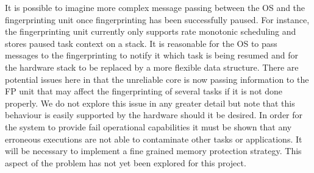 	It is possible to imagine more complex message passing between the OS and the fingerprinting unit once fingerprinting has been successfully paused. 
	For instance, the fingerprinting unit currently only supports rate monotonic scheduling and stores paused task context on a stack. 
	It is reasonable for the OS to pass messages to the fingerprinting to notify it which task is being resumed and for the hardware stack to be replaced by a more flexible data structure. 
	There are potential issues here in that the unreliable core is now passing information to the FP unit that may affect the fingerprinting of several tasks if it is not done properly. 
	We do not explore this issue in any greater detail but note that this behaviour is easily supported by the hardware should it be desired.
In order for the system to provide fail operational capabilities it must be shown that any erroneous executions are not able to contaminate other tasks or applications. It will be necessary to implement a fine grained memory protection strategy. This aspect of the problem has not yet been explored for this project. 
